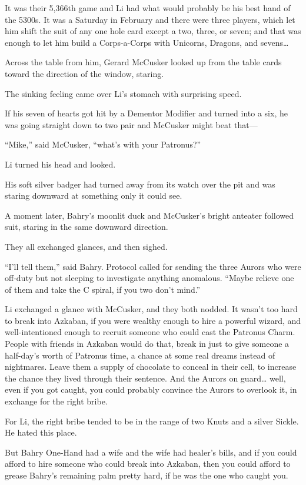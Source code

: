 It was their 5,366th game and Li had what would probably be his best
hand of the 5300s. It was a Saturday in February and there were three
players, which let him shift the suit of any one hole card except a two,
three, or seven; and that was enough to let him build a Corps-a-Corps
with Unicorns, Dragons, and sevens\ldots{}

Across the table from him, Gerard McCusker looked up from the table
cards toward the direction of the window, staring.

The sinking feeling came over Li's stomach with surprising speed.

If his seven of hearts got hit by a Dementor Modifier and turned into a
six, he was going straight down to two pair and McCusker might beat
that---

``Mike,'' said McCusker, ``what's with your Patronus?''

Li turned his head and looked.

His soft silver badger had turned away from its watch over the pit and
was staring downward at something only it could see.

A moment later, Bahry's moonlit duck and McCusker's bright anteater
followed suit, staring in the same downward direction.

They all exchanged glances, and then sighed.

``I'll tell them,'' said Bahry. Protocol called for sending the three
Aurors who were off-duty but not sleeping to investigate anything
anomalous. ``Maybe relieve one of them and take the C spiral, if you two
don't mind.''

Li exchanged a glance with McCusker, and they both nodded. It wasn't too
hard to break into Azkaban, if you were wealthy enough to hire a
powerful wizard, and well-intentioned enough to recruit someone who
could cast the Patronus Charm. People with friends in Azkaban would do
that, break in just to give someone a half-day's worth of Patronus time,
a chance at some real dreams instead of nightmares. Leave them a supply
of chocolate to conceal in their cell, to increase the chance they lived
through their sentence. And the Aurors on guard\ldots{} well, even if
you got caught, you could probably convince the Aurors to overlook it,
in exchange for the right bribe.

For Li, the right bribe tended to be in the range of two Knuts and a
silver Sickle. He hated this place.

But Bahry One-Hand had a wife and the wife had healer's bills, and if
you could afford to hire someone who could break into Azkaban, then you
could afford to grease Bahry's remaining palm pretty hard, if he was the
one who caught you.

